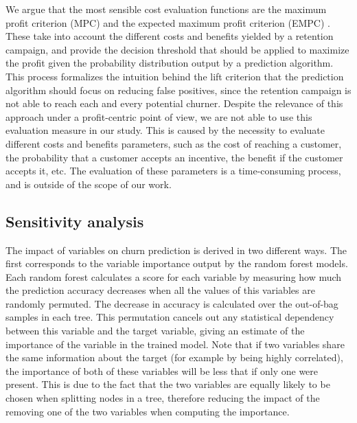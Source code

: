 We argue that the most sensible cost evaluation functions are the maximum profit
criterion (MPC) and the expected maximum profit criterion (EMPC)
\parencite{verbeke2012new, verbraken2013novel}. These take into account the
different costs and benefits yielded by a retention campaign, and provide the
decision threshold that should be applied to maximize the profit given the
probability distribution output by a prediction algorithm. This process
formalizes the intuition behind the lift criterion that the prediction algorithm
should focus on reducing false positives, since the retention campaign is not
able to reach each and every potential churner. Despite the relevance of this
approach under a profit-centric point of view, we are not able to use this
evaluation measure in our study. This is caused by the necessity to evaluate
different costs and benefits parameters, such as the cost of reaching a
customer, the probability that a customer accepts an incentive, the benefit if
the customer accepts it, etc. The evaluation of these parameters is a
time-consuming process, and is outside of the scope of our work.


\subsection{Sensitivity analysis}

The impact of variables on churn prediction is derived in two different ways.
The first corresponds to the variable importance output by the random forest
models. Each random forest calculates a score for each variable by measuring how
much the prediction accuracy decreases when all the values of this variables are
randomly permuted. The decrease in accuracy is calculated over the out-of-bag
samples in each tree. This permutation cancels out any statistical dependency
between this variable and the target variable, giving an estimate of the
importance of the variable in the trained model. Note that if two variables
share the same information about the target (for example by being highly
correlated), the importance of both of these variables will be less that if only
one were present. This is due to the fact that the two variables are equally
likely to be chosen when splitting nodes in a tree, therefore reducing the
impact of the removing one of the two variables when computing the importance.

